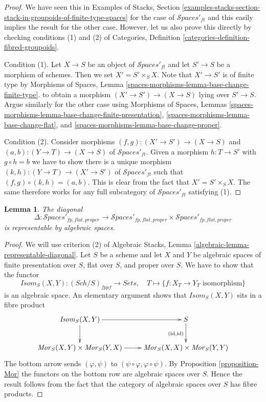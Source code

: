 \documentclass{stacks-project}
\theoremstyle{plain}
\newtheorem{lemma}[subsection]{Lemma}
\theoremstyle{definition}
\theoremstyle{remark}
\numberwithin{equation}{subsection}
\def\Sch{\mathit{Sch}}
\def\Spacesstack{\mathcal{S}\!\mathit{paces}}
\begin{document}
\begin{proof}
We have seen this in
Examples of Stacks, Section
\ref{examples-stacks-section-stack-in-groupoids-of-finite-type-spaces}
for the case of $\Spacesstack'_{ft}$ and this easily implies the
result for the other case. However, let us also prove
this directly by checking conditions (1) and (2) of
Categories, Definition \ref{categories-definition-fibred-groupoids}.

\medskip\noindent
Condition (1). Let $X \to S$ be an object of $\Spacesstack'_{ft}$
and let $S' \to S$ be a morphism of schemes. Then we set
$X' = S' \times_S X$. Note that $X' \to S'$ is of finite type
by Morphisms of Spaces, Lemma
\ref{spaces-morphisms-lemma-base-change-finite-type}.
to obtain a morphism $(X' \to S') \to (X \to S)$
lying over $S' \to S$.
Argue similarly for the other case using
Morphisms of Spaces, Lemmas
\ref{spaces-morphisms-lemma-base-change-finite-presentation},
\ref{spaces-morphisms-lemma-base-change-flat}, and
\ref{spaces-morphisms-lemma-base-change-proper}.

\medskip\noindent
Condition (2). Consider morphisms
$(f, g) : (X' \to S') \to (X \to S)$ and $(a, b) : (Y \to T) \to (X \to S)$
of $\Spacesstack'_{ft}$. Given a morphism $h : T \to S'$ with
$g \circ h = b$ we have to show
there is a unique morphism $(k, h) : (Y \to T) \to (X' \to S')$ of
$\Spacesstack'_{ft}$ such that
$(f, g) \circ (k, h) = (a, b)$.
This is clear from the fact that $X' = S' \times_S X$.
The same therefore works for any full subcategory of
$\Spacesstack'_{ft}$ satisfying (1).
\end{proof}

\begin{lemma}
\label{lemma-spaces-diagonal}
The diagonal
$$
\Delta : \Spacesstack'_{fp, flat, proper} \longrightarrow
\Spacesstack'_{fp, flat, proper} \times \Spacesstack'_{fp, flat, proper}
$$
is representable by algebraic spaces.
\end{lemma}

\begin{proof}
We will use criterion (2) of
Algebraic Stacks, Lemma \ref{algebraic-lemma-representable-diagonal}.
Let $S$ be a scheme and let $X$ and $Y$ be algebraic spaces
of finite presentation over $S$, flat over $S$, and proper over $S$.
We have to show that the functor
$$
\mathit{Isom}_S(X, Y) : (\Sch/S)_{fppf} \longrightarrow \textit{Sets}, \quad
T \longmapsto \{f : X_T \to Y_T \text{ isomorphism}\}
$$
is an algebraic space. An elementary argument shows that
$\mathit{Isom}_S(X, Y)$ sits in a fibre product
$$
\xymatrix{
\mathit{Isom}_S(X, Y) \ar[r] \ar[d] & S \ar[d]_{(\text{id}, \text{id})} \\
\mathit{Mor}_S(X, Y) \times \mathit{Mor}_S(Y, X) \ar[r] &
\mathit{Mor}_S(X, X) \times \mathit{Mor}_S(Y, Y)
}
$$
The bottom arrow sends $(\varphi, \psi)$ to
$(\psi \circ \varphi, \varphi \circ \psi)$.
By Proposition \ref{proposition-Mor} the functors on the bottom row
are algebraic spaces over $S$. 
Hence the result follows from the fact that the category of
algebraic spaces over $S$ has fibre products.
\end{proof}
\end{document}
